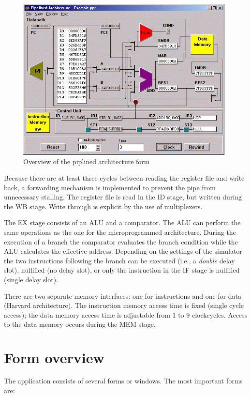\documentclass{article}
\begin{document}
\begin{figure}
\centering
\includegraphics[width=11cm]{graphics/pipe.png}
\caption{Overview of the piplined architecture form}
\label{fig:pipe}
\end{figure}

Because there are at least three cycles between reading the register file and write back, a forwarding mechanism is
implemented to prevent the pipe from unnecessary stalling. The register file is read in the ID stage, but written during
the WB stage. Write through is explicit by the use of multiplexers.

The EX stage consists of an ALU and a comparator. The ALU can perform
 the same operations as the one for the microprogrammed architecture. 
During the execution of a branch the comparator evaluates the branch 
condition while the ALU calculates the effective address. Depending on 
the settings of the simulator the two instructions following the branch
can be executed (i.e., a \emph{double} delay slot), nullified (no delay slot), or only the instruction in the IF stage is
nullified (single delay slot).

There are two separate memory interfaces: one for instructions 
and one for data (Harvard architecture). The instruction memory access 
time is fixed (single cycle access); the data memory access time is 
adjustable from 1 to 9 clockcycles. Access to the data memory occurs 
during the MEM stage. 

\section{Form overview}
The application consists of several forms or windows. The most important forms are:
\end{document}
